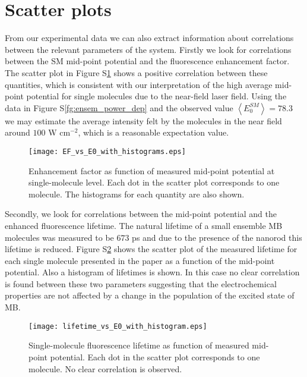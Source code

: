 \documentclass[11pt,a4paper,onecolumn]{article}
\begin{document}
\section{Scatter plots}

From our experimental data we can also extract information about correlations between the relevant parameters of the system. Firstly we look for correlations between the SM mid-point potential and the fluorescence enhancement factor. The scatter plot in Figure S\ref{fg:EF_vs_E0} shows a positive correlation between these quantities, which is consistent with our interpretation of the high average mid-point potential for single molecules due to the near-field laser field. Using the data in Figure S\ref{fg:ensem_power_dep} and the observed value $\left<E_0^{SM}\right>=78.3$ we may estimate the average intensity felt by the molecules in the near field around $100$ W cm$^{-2}$, which is a reasonable expectation value.

\begin{figure}
  \centering
  \texttt{[image: EF\_vs\_E0\_with\_histograms.eps]}
	\makeatletter
	\renewcommand{\fnum@figure}{\figurename~S\thefigure}
	\makeatother
  \caption{Enhancement factor as function of measured mid-point potential at single-molecule level. Each dot in the scatter plot corresponds to one molecule. The histograms for each quantity are also shown.
	}
  \label{fg:EF_vs_E0}
\end{figure}

Secondly, we look for correlations between the mid-point potential and the enhanced fluorescence lifetime. The natural lifetime of a small ensemble MB molecules was measured to be $673$ ps and due to the presence of the nanorod this lifetime is reduced. Figure S\ref{fg:lifetime_vs_E0} shows the scatter plot of the measured lifetime for each single molecule presented in the paper as a function of the mid-point potential. Also a histogram of lifetimes is shown. In this case no clear correlation is found between these two parameters suggesting that the electrochemical properties are not affected by a change in the population of the excited state of MB.  


\begin{figure}
  \centering
  \texttt{[image: lifetime\_vs\_E0\_with\_histogram.eps]}
	\makeatletter
	\renewcommand{\fnum@figure}{\figurename~S\thefigure}
	\makeatother
  \caption{Single-molecule fluorescence lifetime as function of measured mid-point potential. Each dot in the scatter plot corresponds to one molecule. No clear correlation is observed. 
	}
  \label{fg:lifetime_vs_E0}
\end{figure}
\end{document}
